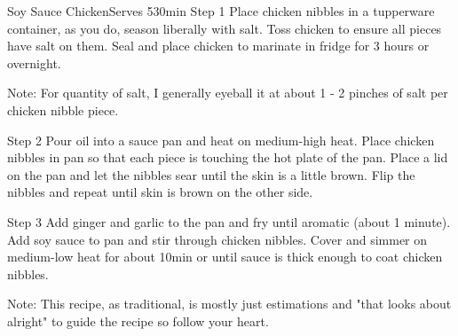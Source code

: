 \begin{recipe}{Soy Sauce Chicken}{Serves 5}{30min}
Step 1
Place chicken nibbles in a tupperware container, as you do, season liberally with salt. Toss chicken to ensure all pieces have salt on them. Seal and place chicken to marinate in fridge for 3 hours or overnight.

Note: For quantity of salt, I generally eyeball it at about 1 - 2 pinches of salt per chicken nibble piece.

Step 2
Pour oil into a sauce pan and heat on medium-high heat. Place chicken nibbles in pan so that each piece is touching the hot plate of the pan. Place a lid on the pan and let the nibbles sear until the skin is a little brown. Flip the nibbles and repeat until skin is brown on the other side.

Step 3
Add ginger and garlic to the pan and fry until aromatic (about 1 minute). Add soy sauce to pan and stir through chicken nibbles. Cover and simmer on medium-low heat for about 10min or until sauce is thick enough to coat chicken nibbles.

Note: This recipe, as traditional, is mostly just estimations and "that looks about alright" to guide the recipe so follow your heart.
\end{recipe}
